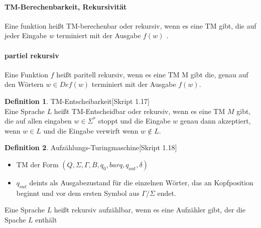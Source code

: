 \documentclass[a4paper, 10pt]{article}
\theoremstyle{definition}
\newtheorem{definition}{Definition}[section]
\newcommand{\kleene}{\Sigma^*}
\begin{document}
\paragraph{TM-Berechenbarkeit, Rekursivität}
Eine funktion heißt TM-berechenbar oder rekursiv, wenn es eine TM gibt, die auf jeder Eingabe $w$ terminiert mit der Ausgabe $f(w)$ .
\paragraph{partiel rekursiv} Eine Funktion $f$ heißt paritell rekursiv, wenn es eine TM M gibt die, genau auf den Wörtern $w\in Def(w)$ terminiert mit der Ausgabe $f(w)$.
\begin{definition}{TM-Entscheibarkeit}[Skript 1.17]\\
Eine Sprache $L$ heißt TM-Entscheidbar oder rekursiv, wenn es eine TM $M$ gibt, die auf allen eingaben $w\in\kleene$ stoppt und die Eingabe $w$ genau dann akzeptiert, wenn $w\in L$ und die Eingabe verwirft wenn $w\not\in L$.
\end{definition}
\begin{definition}{Aufzählungs-Turingmaschine}[Skript 1.18]
\begin{itemize}
\item TM der Form $(Q,\Sigma,\Gamma,B,q_0,bar{q},q_{out},\delta)$
\item $q_{out}$ deints als Ausgabezustand für die einzelnen Wörter, das an Kopfposition beginnt und vor dem ersten Symbol aus $\Gamma /\Sigma$ endet.
\end{itemize}
Eine Sprache $L$ heißt rekursiv aufzählbar, wenn es eine Aufzähler gibt, der die Spache $L$ enthält
\end{definition}
\end{document}
